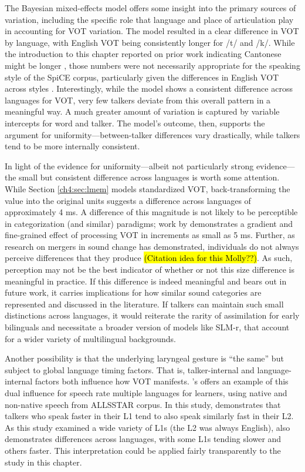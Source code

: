 The Bayesian mixed-effects model offers some insight into the primary sources of variation, including the specific role that language and place of articulation play in accounting for VOT variation. The model resulted in a clear difference in VOT by language, with English VOT being consistently longer for /t/ and /k/. While the introduction to this chapter reported on prior work indicating Cantonese might be longer \citep{clumeck_1981_cantonese, lisker_1964_vot}, those numbers were not necessarily appropriate for the speaking style of the SpiCE corpus, particularly given the differences in English VOT across styles \citep{stuartsmith_2015_private}. Interestingly, while the model shows a consistent difference across languages for VOT, very few talkers deviate from this overall pattern in a meaningful way. A much greater amount of variation is captured by variable intercepts for word and talker. The model's outcome, then, supports the argument for uniformity---between-talker differences vary drastically, while talkers tend to be more internally consistent. 

In light of the evidence for uniformity---albeit not particularly strong evidence---the small but consistent difference across languages is worth some attention. While Section \ref{ch4:sec:lmem} models standardized VOT, back-transforming the value into the original units suggests a difference across languages of approximately 4 ms. A difference of this magnitude is not likely to be perceptible in categorization (and similar) paradigms; work by \citet{mcmurray_2002_gradient} demonstrates a gradient and fine-grained effect of processing VOT in increments as small as 5 ms. Further, as research on mergers in sound change has demonstrated, individuals do not always perceive differences that they produce \hl{(Citation idea for this Molly??)}. As such, perception may not be the best indicator of whether or not this size difference is meaningful in practice. If this difference is indeed meaningful and bears out in future work, it carries implications for how similar sound categories are represented and discussed in the literature. If talkers can maintain such small distinctions across languages, it would reiterate the rarity of assimilation for early bilinguals and necessitate a broader version of models like SLM-r, that account for a wider variety of multilingual backgrounds. 

Another possibility is that the underlying laryngeal gesture is ``the same'' but subject to global language timing factors. That is, talker-internal and language-internal factors both influence how VOT manifests. \citeauthor{bradlow_2017_rate}'s \citeyearpar{bradlow_2017_rate} offers an example of this dual influence for speech rate multiple languages for learners, using native and non-native speech from ALLSSTAR corpus. In this study, \citeauthor{bradlow_2017_rate} demonstrates that talkers who speak faster in their L1 tend to also speak similarly fast in their L2. As this study examined a wide variety of L1s (the L2 was always English), \citeauthor{bradlow_2017_rate} also demonstrates differences across languages, with some L1s tending slower and others faster. This interpretation could be applied fairly transparently to the study in this chapter. 

